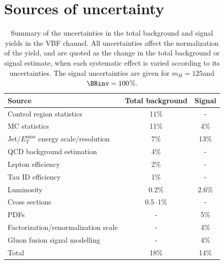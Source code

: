 \section{Sources of uncertainty}


\begin{table}[!htb]
\centering
\begin{tabular}{|l|c|c|}
\hline
Source                              & Total background & Signal \\
\hline\hline
Control region statistics           & 11\%             & -      \\
MC statistics                       & 11\%             & 4\%    \\
Jet/$E_T^{\text{miss}}$ energy scale/resolution   & 7\%              & 13\%   \\
QCD background estimation           & 4\%              & -      \\
Lepton efficiency                   & 2\%              & -      \\
Tau ID efficiency                   & 1\%              & -      \\
Luminosity                          & 0.2\%            & 2.6\%  \\
Cross sections                      & 0.5--1\%         & -      \\
PDFs                                & -                & 5\%    \\
Factorization/renormalization scale & -                & 4\%    \\
Gluon fusion signal modelling       & -                & 4\%    \\
\hline\hline
Total                               & 18\%             & 14\%   \\
\hline 
\end{tabular}
\caption{Summary of the uncertainties in the total background and signal yields in the VBF channel. All uncertainties affect the normalization of the yield, and are quoted as the change in the total background or signal estimate, when each systematic effect is varied according to its uncertainties. The signal uncertainties are given for $m_H=125$\GeV and $\BRinv=100$\%. \cite{ARTICLE:CMSVBFHiggsToInvAndZHCombination}}
\label{TABLE:PromptDataAnalysis_SourcesUncertaintySummary}
\end{table}


